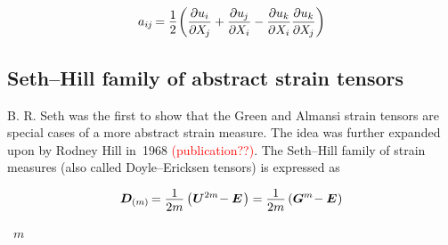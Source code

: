 \nopagebreak\vspace{-0.2em}\begin{equation*}
\displaystyle a_{i\hspace{-0.1ex}j} \hspace{-0.2ex} = \onehalf \hspace{-0.25ex} \left(
\frac{\partial u_{i}}{\partial \hspace{-0.1ex} X_{\hspace{-0.15ex}j}}
+ \frac{\partial u_{\hspace{-0.1ex}j}}{\partial \hspace{-0.1ex} X_{i}}
- \frac{\partial u_{k}}{\partial X_{i}} \frac{\partial u_{k}}{\partial \hspace{-0.1ex} X_{\hspace{-0.15ex}j}}
\right)
\end{equation*}

\subsection*{Seth\hbox{--}Hill family of abstract strain tensors}

B. R. Seth was the first to show that the Green and Almansi strain tensors are special cases of a more abstract strain measure. The idea was further expanded upon by Rodney Hill in~1968 \textcolor{red}{(publication??)}. The Seth\hbox{--}Hill family of strain measures (also called Doyle\hbox{--}Ericksen tensors) is expressed as

\nopagebreak\vspace{-0.1em}\begin{equation*}
\displaystyle \bm{D}_{(m)} \hspace{-0.2ex}
= \frac{\raisebox{-0.2em}{1}}{2m} \left( \hspace{.1ex} \bm{U}^{2m} \hspace{-0.4ex} - \bm{E} \hspace{.2ex} \right)
= \frac{\raisebox{-0.2em}{1}}{2m} \left( \bm{G}^{m} \hspace{-0.4ex} - \bm{E} \hspace{.1ex} \right) \end{equation*}

\vspace{.1em} \noindent {}~$m$

